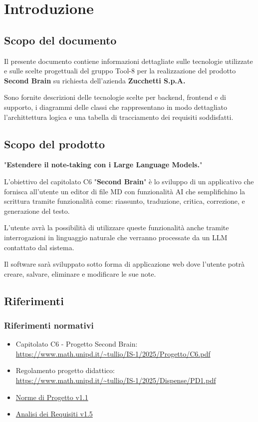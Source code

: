 \documentclass[a4paper,10pt]{article}
\begin{document}
\newpage

\tableofcontents

\newpage

\listoffigures

\newpage

\section{Introduzione}
\subsection{Scopo del documento}
Il presente documento contiene informazioni dettagliate sulle tecnologie utilizzate e sulle scelte progettuali del gruppo Tool-8 per la realizzazione del prodotto \textbf{Second Brain} su richiesta dell'azienda \textbf{Zucchetti S.p.A.}

Sono fornite descrizioni delle tecnologie scelte per backend, frontend e di supporto, i diagrammi delle classi che rappresentano in modo dettagliato l'archittettura logica e una tabella di tracciamento dei requisiti soddisfatti.

\subsection{Scopo del prodotto}
"\textbf{Estendere il note-taking con i Large Language Models.}"

L'obiettivo del capitolato C6 "\textbf{Second Brain}" è lo sviluppo di un applicativo che fornisca all'utente un editor di file MD con funzionalità AI che semplifichino la scrittura tramite funzionalità come: riassunto, traduzione, critica, correzione, e generazione del testo.

L'utente avrà la possibilità di utilizzare queste funzionalità anche tramite interrogazioni in linguaggio naturale che verranno processate da un LLM contattato dal sistema.

Il software sarà sviluppato sotto forma di applicazione web dove l'utente potrà creare, salvare, eliminare e modificare le sue note.

\subsection{Riferimenti}
\subsubsection{Riferimenti normativi}
\begin{itemize}
  \item Capitolato C6 - Progetto Second Brain: \\  \url{https://www.math.unipd.it/~tullio/IS-1/2025/Progetto/C6.pdf}
  \item Regolamento progetto didattico: \\ \url{https://www.math.unipd.it/~tullio/IS-1/2025/Dispense/PD1.pdf}
  \item \href{https://tool-8.github.io/Documentazione-SWE/pb/Norme_di_Progetto_v1.1.pdf}{Norme di Progetto v1.1}
  \item \href{https://tool-8.github.io/Documentazione-SWE/pb/Analisi_dei_Requisiti_v1.5.pdf}{Analisi dei Requisiti v1.5}
\end{itemize}
\end{document}

